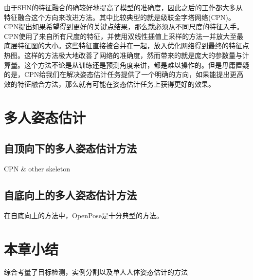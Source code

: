 由于SHN的特征融合的确较好地提高了模型的准确度，因此之后的工作都大多从特征融合这个方向来改进方法。其中比较典型的就是级联金字塔网络(CPN)\cite{Chen2017Cascaded}。CPN提出如果希望得到更好的关键点结果，那么就必须从不同尺度的特征入手。CPN使用了来自所有尺度的特征，并使用双线性插值上采样的方法一并放大至最底层特征图的大小。这些特征直接被合并在一起，放入优化网络得到最终的特征点热图。这样的方法极大地改善了网络的准确度，然而带来的就是庞大的参数量与计算量。这个方法不论是从训练还是预测角度来讲，都是难以操作的。但是毋庸置疑的是，CPN给我们在解决姿态估计任务提供了一个明确的方向，如果能提出更高效的特征融合方法，那么就有可能在姿态估计任务上获得更好的效果。

\section{多人姿态估计}
\label{sec:multipose}
\subsection{自顶向下的多人姿态估计方法}
\label{subsec:topdownpose}
CPN \& other skeleton
\subsection{自底向上的多人姿态估计方法}
\label{subsec:bottomuppose}
在自底向上的方法中，OpenPose\cite{Cao2016Realtime}是十分典型的方法。

\section{本章小结}
综合考量了目标检测，实例分割以及单人人体姿态估计的方法

